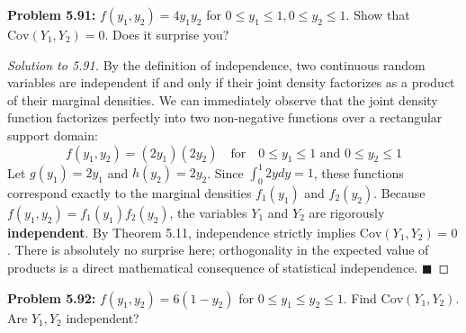 \documentclass[11pt, a4paper]{article}
\theoremstyle{definition}
\theoremstyle{remark}
\newcommand{\Cov}{\mathrm{Cov}}
\begin{document}
\vspace{1em}
\noindent\textbf{Problem 5.91:} $f(y_1, y_2) = 4y_1 y_2$ for $0 \le y_1 \le 1, 0 \le y_2 \le 1$. Show that $\Cov(Y_1, Y_2) = 0$. Does it surprise you?

\begin{proof}[Solution to 5.91]
By the definition of independence, two continuous random variables are independent if and only if their joint density factorizes as a product of their marginal densities.
We can immediately observe that the joint density function factorizes perfectly into two non-negative functions over a rectangular support domain:
\[
f(y_1, y_2) = (2y_1)(2y_2) \quad \text{for} \quad 0 \le y_1 \le 1 \text{ and } 0 \le y_2 \le 1
\]
Let $g(y_1) = 2y_1$ and $h(y_2) = 2y_2$. Since $\int_0^1 2y dy = 1$, these functions correspond exactly to the marginal densities $f_1(y_1)$ and $f_2(y_2)$.
Because $f(y_1, y_2) = f_1(y_1)f_2(y_2)$, the variables $Y_1$ and $Y_2$ are rigorously \textbf{independent}.
By Theorem 5.11, independence strictly implies $\Cov(Y_1, Y_2) = 0$.
There is absolutely no surprise here; orthogonality in the expected value of products is a direct mathematical consequence of statistical independence. $\blacksquare$
\end{proof}

\vspace{1em}
\noindent\textbf{Problem 5.92:} $f(y_1, y_2) = 6(1-y_2)$ for $0 \le y_1 \le y_2 \le 1$. Find $\Cov(Y_1, Y_2)$. Are $Y_1, Y_2$ independent?
\end{document}

